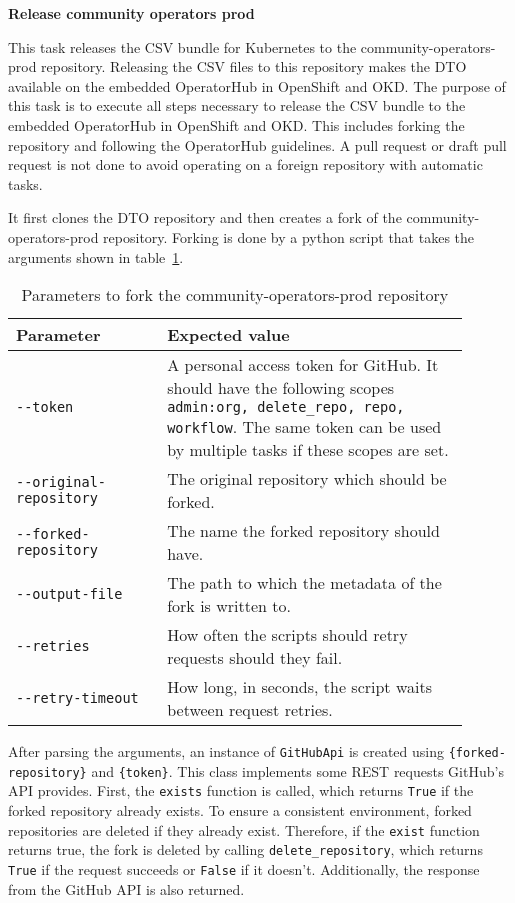 \textbf{Release community operators prod}

This task releases the CSV bundle for Kubernetes to the community-operators-prod repository.
Releasing the CSV files to this repository makes the DTO available on the embedded OperatorHub in OpenShift and OKD.
The purpose of this task is to execute all steps necessary to release the CSV bundle to the embedded OperatorHub in OpenShift and OKD.
This includes forking the repository and following the OperatorHub guidelines.
A pull request or draft pull request is not done to avoid operating on a foreign repository with automatic tasks.

It first clones the DTO repository and then creates a fork of the community-operators-prod repository.
Forking is done by a python script that takes the arguments shown in table~\ref{tab:parameters-to-fork-the-community-operators-prod-repository}.

\begin{table}[h]
    \centering
    \caption{Parameters to fork the community-operators-prod repository}
    \label{tab:parameters-to-fork-the-community-operators-prod-repository}
    \begin{tabular}{p{0.3\linewidth}|p{0.6\linewidth}}
        Parameter & Expected value \\
        \hline
        \verb|--token| & A personal access token for GitHub.
            It should have the following scopes \verb|admin:org, delete_repo, repo, workflow|.
            The same token can be used by multiple tasks if these scopes are set. \\
        \verb|--original-repository| & The original repository which should be forked. \\
        \verb|--forked-repository| & The name the forked repository should have. \\
        \verb|--output-file| & The path to which the metadata of the fork is written to. \\
        \verb|--retries| & How often the scripts should retry requests should they fail. \\
        \verb|--retry-timeout| & How long, in seconds, the script waits between request retries. \\
    \end{tabular}
\end{table}

\pagebreak

After parsing the arguments, an instance of \verb|GitHubApi| is created using \verb|{forked-repository}| and \verb|{token}|.
This class implements some REST requests GitHub's API provides.
First, the \verb|exists| function is called, which returns \verb|True| if the forked repository already exists.
To ensure a consistent environment, forked repositories are deleted if they already exist.
Therefore, if the \verb|exist| function returns true, the fork is deleted by calling \verb|delete_repository|, which returns \verb|True| if the request succeeds or \verb|False| if it doesn't.
Additionally, the response from the GitHub API is also returned.

